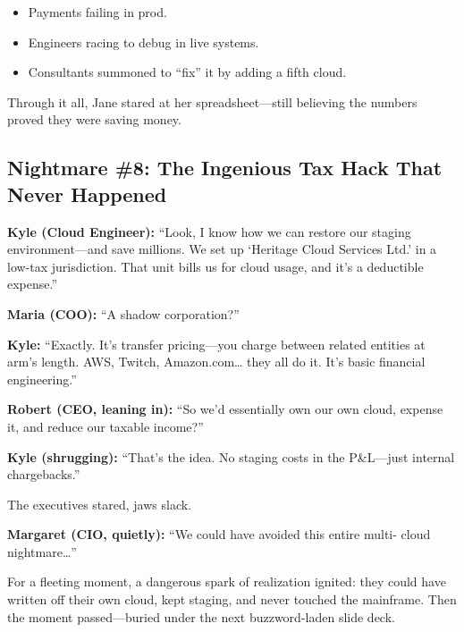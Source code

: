 \begin{itemize}
  \item Payments failing in prod.
  \item Engineers racing to debug in live systems.
  \item Consultants summoned to “fix” it by adding a fifth cloud.
\end{itemize}

Through it all, Jane stared at her spreadsheet—still believing the numbers  
proved they were saving money.  

\subsection{Nightmare \#8: The Ingenious Tax Hack That Never Happened}

\medskip

\textbf{Kyle (Cloud Engineer):} “Look, I know how we can restore our staging  
environment—and save millions. We set up ‘Heritage Cloud Services Ltd.’ in  
a low-tax jurisdiction. That unit bills us for cloud usage, and it’s a  
deductible expense.”

\medskip

\textbf{Maria (COO):} “A shadow corporation?”

\medskip

\textbf{Kyle:} “Exactly. It’s transfer pricing—you charge between related  
entities at arm’s length. AWS, Twitch, Amazon.com… they all do it. It’s  
basic financial engineering.”

\medskip

\textbf{Robert (CEO, leaning in):} “So we’d essentially own our own cloud,  
expense it, and reduce our taxable income?”

\medskip

\textbf{Kyle (shrugging):} “That’s the idea. No staging costs in the P\&L—just  
internal chargebacks.”

\medskip

The executives stared, jaws slack.

\medskip

\textbf{Margaret (CIO, quietly):} “We could have avoided this entire multi-
cloud nightmare…”

\medskip

For a fleeting moment, a dangerous spark of realization ignited: they could  
have written off their own cloud, kept staging, and never touched the  
mainframe. Then the moment passed—buried under the next buzzword-laden  
slide deck.  

